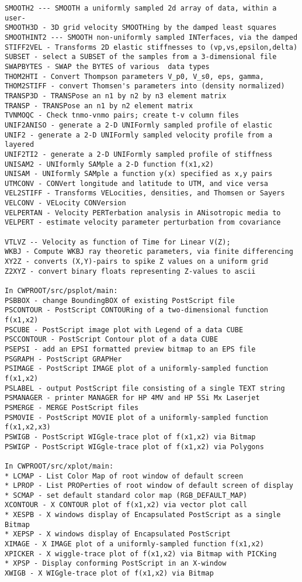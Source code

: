 {\begin{verbatim}
SMOOTH2 --- SMOOTH a uniformly sampled 2d array of data, within a user-
SMOOTH3D - 3D grid velocity SMOOTHing by the damped least squares	
SMOOTHINT2 --- SMOOTH non-uniformly sampled INTerfaces, via the damped
STIFF2VEL - Transforms 2D elastic stiffnesses to (vp,vs,epsilon,delta) 
SUBSET - select a SUBSET of the samples from a 3-dimensional file	
SWAPBYTES - SWAP the BYTES of various  data types			
THOM2HTI - Convert Thompson parameters V_p0, V_s0, eps, gamma,	
THOM2STIFF - convert Thomsen's parameters into (density normalized)	
TRANSP3D - TRANSPose an n1 by n2 by n3 element matrix			
TRANSP - TRANSPose an n1 by n2 element matrix				
TVNMOQC - Check tnmo-vnmo pairs; create t-v column files           
UNIF2ANISO - generate a 2-D UNIFormly sampled profile of elastic	
UNIF2 - generate a 2-D UNIFormly sampled velocity profile from a layered
UNIF2TI2 - generate a 2-D UNIFormly sampled profile of stiffness 	
UNISAM2 - UNIformly SAMple a 2-D function f(x1,x2)			
UNISAM - UNIformly SAMple a function y(x) specified as x,y pairs	
UTMCONV - CONVert longitude and latitude to UTM, and vice versa       
VEL2STIFF - Transforms VELocities, densities, and Thomsen or Sayers   
VELCONV - VELocity CONVersion					
VELPERTAN - Velocity PERTerbation analysis in ANisotropic media to    
VELPERT - estimate velocity parameter perturbation from covariance 	

VTLVZ -- Velocity as function of Time for Linear V(Z);		
WKBJ - Compute WKBJ ray theoretic parameters, via finite differencing	
XY2Z - converts (X,Y)-pairs to spike Z values on a uniform grid	
Z2XYZ - convert binary floats representing Z-values to ascii	

In CWPROOT/src/psplot/main:
PSBBOX - change BoundingBOX of existing PostScript file	
PSCONTOUR - PostScript CONTOURing of a two-dimensional function f(x1,x2)
PSCUBE - PostScript image plot with Legend of a data CUBE       
PSCCONTOUR - PostScript Contour plot of a data CUBE		        
PSEPSI - add an EPSI formatted preview bitmap to an EPS file		
PSGRAPH - PostScript GRAPHer						
PSIMAGE - PostScript IMAGE plot of a uniformly-sampled function f(x1,x2)
PSLABEL - output PostScript file consisting of a single TEXT string	
PSMANAGER - printer MANAGER for HP 4MV and HP 5Si Mx Laserjet 
PSMERGE - MERGE PostScript files					
PSMOVIE - PostScript MOVIE plot of a uniformly-sampled function f(x1,x2,x3)
PSWIGB - PostScript WIGgle-trace plot of f(x1,x2) via Bitmap		
PSWIGP - PostScript WIGgle-trace plot of f(x1,x2) via Polygons	

In CWPROOT/src/xplot/main:
* LCMAP - List Color Map of root window of default screen 
* LPROP - List PROPerties of root window of default screen of display 
* SCMAP - set default standard color map (RGB_DEFAULT_MAP)
XCONTOUR - X CONTOUR plot of f(x1,x2) via vector plot call		
* XESPB - X windows display of Encapsulated PostScript as a single Bitmap
* XEPSP - X windows display of Encapsulated PostScript
XIMAGE - X IMAGE plot of a uniformly-sampled function f(x1,x2)     	
XPICKER - X wiggle-trace plot of f(x1,x2) via Bitmap with PICKing	
* XPSP - Display conforming PostScript in an X-window
XWIGB - X WIGgle-trace plot of f(x1,x2) via Bitmap			


\end{verbatim}}
